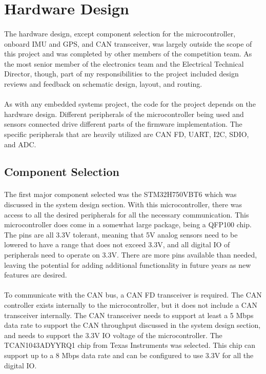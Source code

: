 \section{Hardware Design}

\paragraph{}
The hardware design, except component selection for the microcontroller, onboard IMU and GPS, and CAN transceiver, was largely outside the scope of this project and was completed by other members of the competition team.
As the most senior member of the electronics team and the Electrical Technical Director, though, part of my responsibilities to the project included design reviews and feedback on schematic design, layout, and routing.

\paragraph{}
As with any embedded systems project, the code for the project depends on the hardware design.
Different peripherals of the microcontroller being used and sensors connected drive different parts of the firmware implementation.
The specific peripherals that are heavily utilized are CAN FD, UART, I2C, SDIO, and ADC.

\subsection{Component Selection}

\paragraph{}
The first major component selected was the STM32H750VBT6 which was discussed in the system design section.
With this microcontroller, there was access to all the desired peripherals for all the necessary communication.
This microcontroller does come in a somewhat large package, being a QFP100 chip.
The pins are all 3.3V tolerant, meaning that 5V analog sensors need to be lowered to have a range that does not exceed 3.3V, and all digital IO of peripherals need to operate on 3.3V.
There are more pins available than needed, leaving the potential for adding additional functionality in future years as new features are desired.

\paragraph{}
To communicate with the CAN bus, a CAN FD transceiver is required.
The CAN controller exists internally to the microcontroller, but it does not include a CAN transceiver internally.
The CAN transceiver needs to support at least a 5 Mbps data rate to support the CAN throughput discussed in the system design section, and needs to support the 3.3V IO voltage of the microcontroller.
The TCAN1043ADYYRQ1 chip from Texas Instruments \cite{CANProductPage} was selected.
This chip can support up to a 8 Mbps data rate and can be configured to use 3.3V for all the digital IO.

